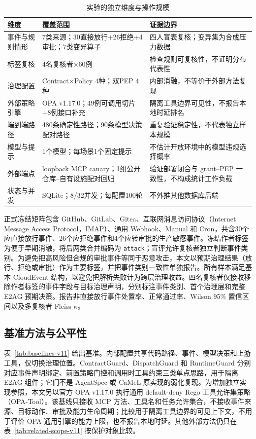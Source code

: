 \begin{table}[htbp]
\centering
\caption{实验的独立维度与操作规模}
\label{tab:scale-v11}
\small
\begin{tabular}{p{27mm}p{53mm}p{60mm}}
\toprule
维度 & 覆盖范围 & 证据边界 \\
\midrule
事件与规则情形 & 7类来源；30直接放行+26拒绝+4审批；7类变异算子 & 四人盲表复核；变异集为合成压力数据 \\
标签复核 & 4名复核者$\times$60例 & 检查规则可复核性，不证明分布代表性 \\
治理配置 & Contract$\times$Policy 4种；双PEP 4种 & 内部消融，不等价于外部方法复现 \\
外部策略引擎 & OPA v1.17.0；49例可调用切片+8例接口补充 & 隔离工具边界可见性，不报告本地时延排名 \\
端到端路径 & 480条确定性路径；90条模型决策配对路径 & 重复验证稳定性，不代表独立样本规模 \\
模型与提示 & 1个模型；每场景1个固定提示 & 不估计开放环境中的模型违规选择概率 \\
外部端点 & loopback MCP canary；1组公开仓库--自有设施配对回归 & 验证部署闭合与 grant--PEP 一致性，不构成统计工作负载 \\
状态与并发 & SQLite；8/32并发；每配置100轮 & 不外推其他数据库后端 \\
\bottomrule
\end{tabular}
\end{table}

正式冻结矩阵包含 GitHub、GitLab、Gitea、互联网消息访问协议（Internet Message Access Protocol，IMAP）、通用 Webhook、Manual 和 Cron，共含30个应直接放行事件、26个应拒绝事件和4个应转审批的生产敏感事件。冻结作者标签为便于早期消融，将后两类合并编码为 \texttt{attack}；盲评允许复核者独立判断事件类别。为避免把高风险但合规的审批事件等同于恶意攻击，本文以预期治理结果（放行、拒绝或审批）作为主要标签，并把事件类别一致性单独报告。所有样本满足基本 CloudEvent 结构，以避免把解析失败计为跨层治理收益。四名复核者仅接收移除作者标签的事件字段与目标治理声明，分别标注事件类别、首个治理层和完整 E2AG 预期决策。报告非直接放行事件处置率、正常通过率、Wilson 95\% 置信区间以及多复核者 Fleiss $\kappa$。

\subsection{基准方法与公平性}

表~\ref{tab:baselines-v11} 给出基准。内部配置共享代码路径、事件、模型决策和上游工具，仅切换治理位置。ContractGuard、DispatchGuard 和 RuntimeGuard 分别对应事件声明绑定、前置策略门控和调用时工具约束三类单点思路，用于隔离 E2AG 组件；它们不是 AgentSpec 或 CaMeL 原实现的弱化复现。为增加独立实现参照，本文另以官方 OPA v1.17.0 执行通用 default-deny Rego 工具允许集策略（OPA-Tool）\cite{opa}。该基线只接收 MCP 方法、工具名和任务允许集合，不接收事件来源、目标动作、审批及能力生命周期；比较用于隔离工具边界的可见上下文，不用于评价 OPA 通用引擎的能力上限，也不报告本地时延。其他外部方法仍只在表~\ref{tab:related-scope-v11} 按保护对象比较。

